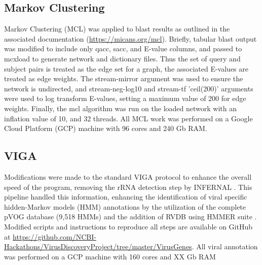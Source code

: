   \subsection{Markov Clustering}
  Markov Clustering (MCL) \cite{Enright2002} was applied to blast results as
  outlined in the associated documentation (\url{https://micans.org/mcl}).
  Briefly, tabular blast output was modified to include only qacc, sacc, and
  E-value columns, and passed to mcxload to generate network and dictionary
  files. Thus the set of query and subject pairs is treated as the edge set for
  a graph, the associated E-values are treated as edge weights. The
  stream-mirror argument was used to ensure the network is undirected, and
  stream-neg-log10  and stream-tf 'ceil(200)' arguments were used to log
  transform E-values, setting a maximum value of 200 for edge weights. Finally,
  the mcl algorithm was run on the loaded network with an inflation value of
  10, and 32 threads. All MCL work was performed on a Google Cloud Platform
  (GCP) machine with 96 cores and 240 Gb RAM.

  \subsection{VIGA}
  Modifications were made to the standard VIGA \cite{Gonzalez-Tortuero2018}
  protocol to enhance the overall speed of the program, removing the rRNA
  detection step by INFERNAL \cite{Nawrocki2013}. This pipeline handled this
  information, enhancing the identification of viral specific hidden-Markov
  models (HMM) annotations by the utilization of the complete pVOG database
  \cite{Grazziotin2017} (9,518 HMMs) and the addition of RVDB
  \cite{Goodacre2018} using HMMER suite \cite{hmmer}. Modified scripts and
  instructions to reproduce all steps are available on GitHub at
  \url{https://github.com/NCBI-Hackathons/VirusDiscoveryProject/tree/master/VirusGenes}.
  All viral annotation was performed on a GCP machine with 160 cores and XX
  Gb RAM
